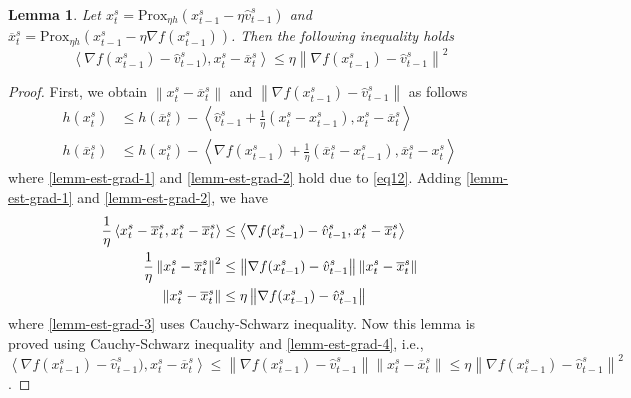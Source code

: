 \documentclass{article}
\newcommand*{\Po}{\text{Prox}}
\newcommand{\norm}[1]{\left\lVert#1\right\rVert}
\newcommand{\Iprod}[2]{\left\langle #1,#2\right\rangle}
\newtheorem{lemma}[theorem]{Lemma}
\theoremstyle{definition}
\theoremstyle{remark}
\begin{document}
\begin{lemma}\label{lemm-est-grad}
Let  $x_{t}^s= \Po_{\eta h}(x_{t-1}^s - \eta \hat{v}_{t-1}^s)$ and $\overline{x}_{t}^s= \Po_{\eta h}(x_{t-1}^s - \eta \nabla f(x_{t-1}^s))$. Then the following inequality holds
\[
\Iprod{\nabla f(x_{t-1}^s) -\hat{v}_{t-1}^s)}{x_t^s -\overline{x}_t^s} \leq \eta\norm{\nabla f(x_{t-1}^s)-\hat{v}_{t-1}^s}^2
\]
\end{lemma}
\begin{proof}
First, we obtain $\norm{x_{t}^s-\overline{x}_{t}^s}$ and $\norm{\nabla f(x_{t-1}^s)-\hat{v}_{t-1}^s}$ as follows 
\begin{align}
h(x_t^s)&\leq h(\overline{x}_t^s) - \Iprod{\hat{v}_{t-1}^s+\frac{1}{\eta}(x_t^s-x_{t-1}^s)}{x_t^s-\overline{x}_t^s}\label{lemm-est-grad-1}\\
h(\overline{x}_t^s)&\leq h({x}_t^s) - \Iprod{\nabla f(x_{t-1}^s)+\frac{1}{\eta}(\overline{x}_t^s-x_{t-1}^s)}{\overline{x}_t^s-x_t^s}\label{lemm-est-grad-2}
\end{align}
where \eqref{lemm-est-grad-1} and \eqref{lemm-est-grad-2} hold due to \eqref{eq12}. Adding \eqref{lemm-est-grad-1} and \eqref{lemm-est-grad-2}, we have 
\begin{align}
\frac{1}{\eta}\Iprod{x_t^s -\overline{x}_t^s}{x_t^s -\overline{x}_t^s} &\leq \Iprod{\nabla f(x_{t-1}^s) -\hat{v}_{t-1}^s}{x_t^s -\overline{x}_t^s}\notag\\
\frac{1}{\eta}\norm{x_t^s -\overline{x}_t^s}^2 &\leq \norm{\nabla f(x_{t-1}^s) -\hat{v}_{t-1}^s}\norm{x_t^s -\overline{x}_t^s}\label{lemm-est-grad-3}\\
\norm{x_t^s -\overline{x}_t^s} &\leq \eta\norm{\nabla f(x_{t-1}^s) -\hat{v}_{t-1}^s}\label{lemm-est-grad-4}
\end{align}
where \eqref{lemm-est-grad-3} uses Cauchy-Schwarz inequality. Now this lemma is proved using Cauchy-Schwarz inequality and \eqref{lemm-est-grad-4}, i.e., $\Iprod{\nabla f(x_{t-1}^s) -\hat{v}_{t-1}^s)}{x_t^s -\overline{x}_t^s} \leq \norm{\nabla f(x_{t-1}^s)-\hat{v}_{t-1}^s} \norm{x_t^s -\overline{x}_t^s} \leq \eta\norm{\nabla f(x_{t-1}^s)-\hat{v}_{t-1}^s}^2$.
\end{proof}




\end{document}
